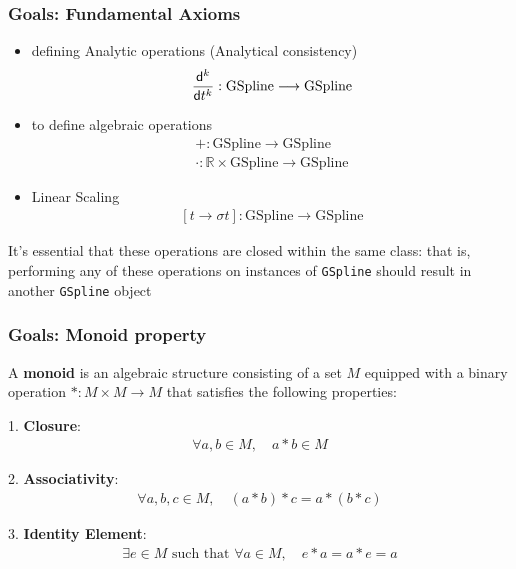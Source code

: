\begin{frame}[t]
	\frametitle{Goals: Fundamental Axioms}
	{\fontsize{9}{5}
		\begin{itemize}
			\item defining Analytic operations (Analytical consistency)
			      \begin{equation*}
				      \frac{\mathsf{d}^{k} }{\mathsf{d} t^{k}}:\text{GSpline}\longrightarrow \text{GSpline}
			      \end{equation*}
			\item to define algebraic operations
			      \begin{eqnarray*}
				      +:\text{GSpline}\longrightarrow \text{GSpline}\\
				      \cdot:\mathbb{R} \times \text{GSpline}\longrightarrow \text{GSpline}
			      \end{eqnarray*}
			\item Linear Scaling
			      \begin{eqnarray*}
				      \left[t \rightarrow \sigma t \right]:\text{GSpline}\longrightarrow \text{GSpline}
			      \end{eqnarray*}
		\end{itemize}
		It's essential that these operations are closed within the same class: that is, performing any of these operations on instances of \Verb|GSpline| should result in another \Verb|GSpline| object
	}
\end{frame}
\begin{frame}[t]
	\frametitle{Goals: Monoid property}

	{\fontsize{10}{5}
		A \textbf{monoid} is an algebraic structure consisting of a set $M$ equipped with a binary operation
		$ \ast : M \times M \to M $ that satisfies the following properties:

		1. \textbf{Closure}:
		\begin{eqnarray*}
			\forall a, b \in M, \quad a \ast b \in M
		\end{eqnarray*}

		2. \textbf{Associativity}:
		\begin{eqnarray*}
			\forall a, b, c \in M, \quad (a \ast b) \ast c = a \ast (b \ast c)
		\end{eqnarray*}

		3. \textbf{Identity Element}:
		\begin{eqnarray*}
			\exists e \in M \text{ such that } \forall a \in M, \quad e \ast a = a \ast e = a
		\end{eqnarray*}

	}
\end{frame}
